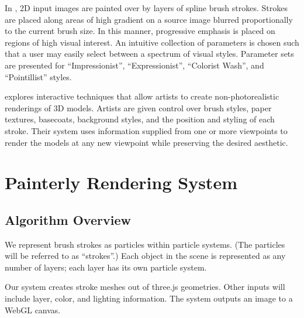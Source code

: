 \documentclass[conference]{acmsiggraph}
\begin{document}
In \cite{Hertzmann:1998:PRC:280814.280951}, 2D input images are painted over
by layers of spline brush strokes. Strokes are placed along areas of high
gradient on a source image blurred proportionally to the current brush size. In
this manner, progressive emphasis is  placed on regions of high visual
interest. An intuitive collection of parameters is chosen such that a user may
easily select between a spectrum of visual styles. Parameter sets are presented
for ``Impressionist'', ``Expressionist'', ``Colorist Wash'', and ``Pointillist''
styles.

\cite{Kalnins:2002:WND:566570.566648} explores interactive techniques that
allow artists to create non-photorealistic renderings of 3D models. Artists are
given control over brush styles, paper textures, basecoats, background styles,
and the position and styling of each stroke. Their system uses information
supplied from one or more viewpoints to render the models at any new viewpoint
while preserving the desired aesthetic.



\section{Painterly Rendering System}

\subsection{Algorithm Overview}

We represent brush strokes as particles within particle systems. (The particles
will be referred to as ``strokes''.) Each object in the scene is represented as
any number of layers; each layer has its own particle system.

Our system creates stroke meshes out of three.js geometries. Other inputs will
include layer, color, and lighting information. The system outputs an image to
a WebGL canvas.
\end{document}
